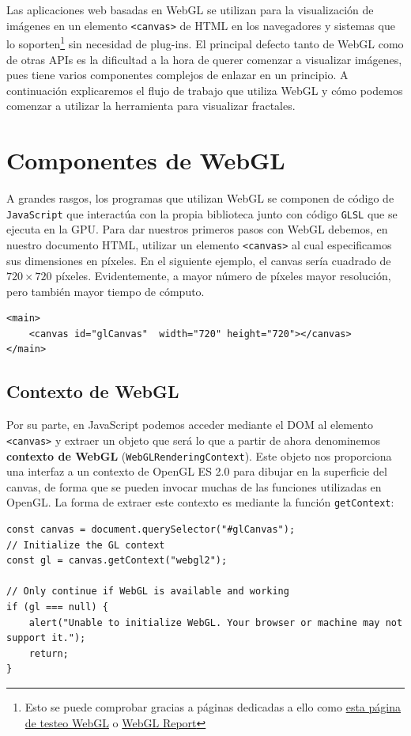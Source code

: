 Las aplicaciones web basadas en WebGL se utilizan para la visualización de imágenes en un elemento \verb|<canvas>| de HTML en los navegadores y sistemas que lo soporten\footnote{Esto se puede comprobar gracias a páginas dedicadas a ello como \href{https://get.webgl.org/}{esta página de testeo WebGL} o \href{http://webglreport.com/}{WebGL Report}} sin necesidad de plug-ins. El principal defecto tanto de WebGL como de otras APIs es la dificultad a la hora de querer comenzar a visualizar imágenes, pues tiene varios componentes complejos de enlazar en un principio. A continuación explicaremos el flujo de trabajo que utiliza WebGL y cómo podemos comenzar a utilizar la herramienta para visualizar fractales.

\section{Componentes de WebGL}
\label{section:componentes-wgl}

A grandes rasgos, los programas que utilizan WebGL se componen de código de \verb|JavaScript| que interactúa con la propia biblioteca junto con código \verb|GLSL| que se ejecuta en la GPU. Para dar nuestros primeros pasos con WebGL debemos, en nuestro documento HTML, utilizar un elemento \verb|<canvas>| al cual especificamos sus dimensiones en píxeles. En el siguiente ejemplo, el canvas sería cuadrado de $720\times 720$ píxeles. Evidentemente, a mayor número de píxeles mayor resolución, pero también mayor tiempo de cómputo.

\begin{lstlisting}
<main>
    <canvas id="glCanvas"  width="720" height="720"></canvas>
</main>
\end{lstlisting}

\subsection{Contexto de WebGL}

Por su parte, en JavaScript podemos acceder mediante el DOM al elemento \verb|<canvas>| y extraer un objeto que será lo que a partir de ahora denominemos \textbf{contexto de WebGL} (\verb|WebGLRenderingContext|). Este objeto nos proporciona una interfaz a un contexto de OpenGL ES 2.0 para dibujar en la superficie del canvas, de forma que se pueden invocar muchas de las funciones utilizadas en OpenGL. La forma de extraer este contexto es mediante la función \verb|getContext|:

\begin{lstlisting}
const canvas = document.querySelector("#glCanvas");
// Initialize the GL context
const gl = canvas.getContext("webgl2");

// Only continue if WebGL is available and working
if (gl === null) {
    alert("Unable to initialize WebGL. Your browser or machine may not support it.");
    return;
}
\end{lstlisting}

